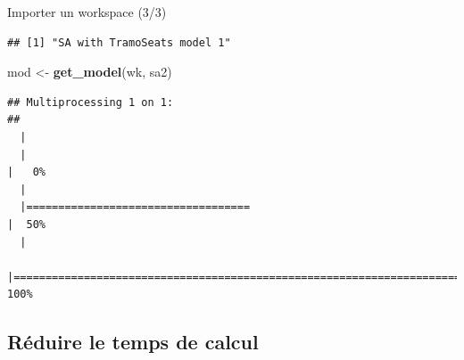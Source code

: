 \documentclass[10pt,xcolor=table,color={dvipsnames,usenames},ignorenonframetext,usepdftitle=false,french]{beamer}
\newenvironment{Shaded}{\begin{snugshade}}{\end{snugshade}}
\newcommand{\KeywordTok}[1]{\textcolor[rgb]{0.13,0.29,0.53}{\textbf{#1}}}
\newcommand{\NormalTok}[1]{#1}
\newcommand{\StringTok}[1]{\textcolor[rgb]{0.31,0.60,0.02}{#1}}
\begin{document}
\begin{frame}[fragile]{Importer un workspace (3/3)}
\begin{verbatim}
## [1] "SA with TramoSeats model 1"
\end{verbatim}

\begin{Shaded}
\begin{Highlighting}[]
\NormalTok{mod <-}\StringTok{ }\KeywordTok{get_model}\NormalTok{(wk, sa2)}
\end{Highlighting}
\end{Shaded}

\begin{verbatim}
## Multiprocessing 1 on 1:
## 
  |                                                                            
  |                                                                      |   0%
  |                                                                            
  |===================================                                   |  50%
  |                                                                            
  |======================================================================| 100%
\end{verbatim}

\end{frame}

\hypertarget{ruxe9duire-le-temps-de-calcul}{%
\subsection{Réduire le temps de
calcul}\label{ruxe9duire-le-temps-de-calcul}}
\end{document}
